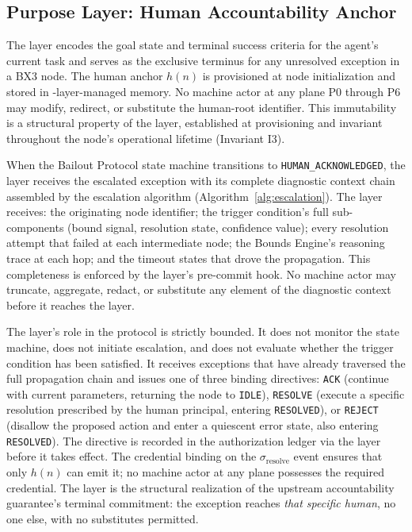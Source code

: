 \subsection{Purpose Layer: Human Accountability Anchor}
\label{sec:bailout-purpose-layer}

The \purpose{} layer encodes the goal state and terminal success criteria for
the agent's current task and serves as the exclusive terminus for any
unresolved exception in a BX3 node.  The human anchor $h(n)$ is provisioned at
node initialization and stored in \fact{}-layer-managed memory.  No machine
actor at any plane P0 through P6 may modify, redirect, or substitute the
human-root identifier.  This immutability is a structural property of the
\purpose{} layer, established at provisioning and invariant throughout the
node's operational lifetime (Invariant I3).

When the Bailout Protocol state machine transitions to
\texttt{HUMAN\_ACKNOWLEDGED}, the \purpose{} layer receives the escalated
exception with its complete diagnostic context chain assembled by the
escalation algorithm (Algorithm~\ref{alg:escalation}).  The layer receives:
the originating node identifier; the trigger condition's full sub-components
(bound signal, resolution state, confidence value); every resolution attempt
that failed at each intermediate node; the Bounds Engine's reasoning trace at
each hop; and the timeout states that drove the propagation.  This
completeness is enforced by the \fact{} layer's pre-commit hook.  No machine
actor may truncate, aggregate, redact, or substitute any element of the
diagnostic context before it reaches the \purpose{} layer.

The \purpose{} layer's role in the protocol is strictly bounded.  It does not
monitor the state machine, does not initiate escalation, and does not evaluate
whether the trigger condition has been satisfied.  It receives exceptions that
have already traversed the full propagation chain and issues one of three
binding directives: \texttt{ACK} (continue with current parameters, returning
the node to \texttt{IDLE}), \texttt{RESOLVE} (execute a specific resolution
prescribed by the human principal, entering \texttt{RESOLVED}), or
\texttt{REJECT} (disallow the proposed action and enter a quiescent error
state, also entering \texttt{RESOLVED}).  The directive is recorded in the
authorization ledger via the \fact{} layer before it takes effect.  The
credential binding on the $\sigma_{\text{resolve}}$ event ensures that only
$h(n)$ can emit it; no machine actor at any plane possesses the required
credential.  The \purpose{} layer is the structural realization of the
upstream accountability guarantee's terminal commitment: the exception reaches
\emph{that specific human}, no one else, with no substitutes permitted.

